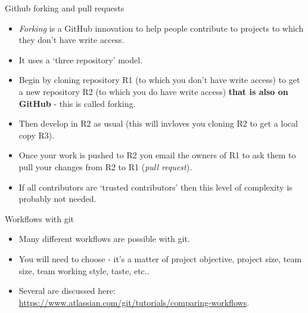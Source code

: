 \documentclass[usenames,dvipsnames]{beamer}
\begin{document}
\begin{frame}{Github forking and pull requests}
  \begin{block}{}
    \begin{itemize}
      \item{\textit{Forking} is a GitHub innovation to help people contribute to projects to which they don't have write access.}
      \item{It uses a `three repository' model.}
      \item{Begin by cloning repository R1 (to which you don't have write access) to get a new repository R2 (to which you do have write access) \textbf{that is also on GitHub} - this is called forking.}
      \item{Then develop in R2 as usual (this will invloves you cloning R2 to get a local copy R3).}
      \item{Once your work is pushed to R2 you email the owners of R1 to ask them to pull your changes from R2 to R1 (\textit{pull request}).}
      \item{If all contributors are `trusted contributors' then this level of complexity is probably not needed.}
    \end{itemize}
  \end{block}
\end{frame}

\begin{frame}{Workflows with git}
  \begin{block}{}
    \begin{itemize}
      \item{Many different workflows are possible with git.}
      \item{You will need to choose - it's a matter of project objective, project size, team size, team working style, taste, etc..}
      \item{Several are discussed here: \url{https://www.atlassian.com/git/tutorials/comparing-workflows}.}
    \end{itemize}
  \end{block}
\end{frame}
\end{document}
